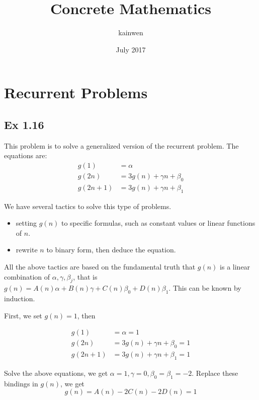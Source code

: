 \documentclass{article}
\title{Concrete Mathematics}
\author{kainwen}
\date{July 2017}
\begin{document}
\maketitle

\section{Recurrent Problems}

\subsection{Ex 1.16}

This problem is to solve a generalized version of the recurrent problem. The equations are:
\begin{equation} \label{eq1}
    \begin{split}
    g(1) & = \alpha \\
    g(2n) & = 3g(n) + \gamma n + \beta_0 \\
    g(2n+1) & = 3g(n) + \gamma n + \beta_1 
    \end{split}
\end{equation}

We have several tactics to solve this type of problems.
\begin{itemize}
    \item setting $g(n)$ to specific formulas, such as constant values or linear functions of $n$.
    \item rewrite $n$ to binary form, then deduce the equation.
\end{itemize}

All the above tactics are based on the fundamental truth that $g(n)$ is a linear combination of $\alpha, \gamma, \beta_j$, that is $g(n)=A(n)\alpha + B(n)\gamma + C(n)\beta_0 + D(n)\beta_1$. This can be known by induction.

First, we set $g(n)=1$, then

\begin{equation}
    \begin{split}
        g(1) & = \alpha = 1 \\
        g(2n) & = 3g(n) + \gamma n + \beta_0 = 1 \\
        g(2n+1) & = 3g(n) + \gamma n + \beta_1 = 1
    \end{split}
\end{equation}

Solve the above equations, we get $\alpha = 1, \gamma = 0, \beta_0 = \beta_1 = -2$. Replace these bindings in $g(n)$, we get
\begin{equation}
    g(n) = A(n) -2C(n) - 2D(n) = 1
\end{equation}
\end{document}
